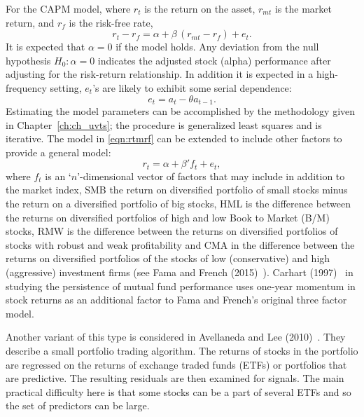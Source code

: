 For the CAPM model, where $r_t$ is the return on the asset, $r_{mt}$ is the market return, and $r_f$ is the risk-free rate,
	\begin{equation} \label{eqn:rtmrf}
	r_t - r_f = \alpha + \beta \,( r_{mt} - r_f ) + e_t.
	\end{equation}
It is expected that $\alpha= 0$ if the model holds. Any deviation from the null hypothesis $H_0: \alpha= 0$ indicates the adjusted stock (alpha) performance after adjusting for the risk-return relationship. In addition it is expected in a high-frequency setting, $e_t$'s are likely to exhibit some serial dependence:
	\begin{equation} \label{eqn:et}
	e_t = a_t - \theta a_{t-1}.
	\end{equation}
Estimating the model parameters can be accomplished by the methodology given in Chapter~\ref{ch:ch_uvts}; the procedure is generalized least squares and is iterative. The model in \eqref{eqn:rtmrf} can be extended to include other factors to provide a general model:
	\begin{equation} \label{eqn:rtalpha}
	r_t = \alpha + \beta'f_{t} + e_t,
	\end{equation}
where $f_t$ is an `$n$'-dimensional vector of factors that may include in addition to the market index, SMB the return on diversified portfolio of small stocks minus the return on a diversified portfolio of big stocks, HML is the difference between the returns on diversified portfolios of high and low Book to Market (B/M) stocks, RMW is the difference between the returns on diversified portfolios of stocks with robust and weak profitability and CMA in the difference between the returns on diversified portfolios of the stocks of low (conservative) and high (aggressive) investment firms (see Fama and French (2015)~\cite{fama2015}). Carhart (1997)~\cite{carhart1997persistence} in studying the persistence of mutual fund performance uses one-year momentum in stock returns as an additional factor to Fama and French's original three factor model.


Another variant of this type is considered in Avellaneda and Lee (2010)~\cite{avellee}. They describe a small portfolio trading algorithm. The returns of stocks in the portfolio are regressed on the returns of exchange traded funds (ETFs) or portfolios that are predictive. The resulting residuals are then examined for signals. The main practical difficulty here is that some stocks can be a part of several ETFs and so the set of predictors can be large. 


